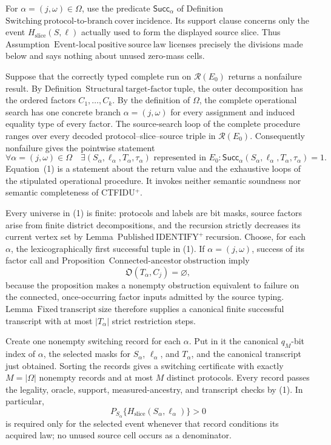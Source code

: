 For \(\alpha=(j,\omega)\in\Omega\), use the predicate
\(\mathsf{Succ}_{\alpha}\) of Definition~\(\mathrm{Switching\ protocol\mbox{-}to\mbox{-}branch\ cover\ incidence}\).
Its support clause concerns only the event \(H_{\mathrm{slice}}(S,\ell)\) actually used to form the displayed source slice.  Thus Assumption~\(\mathrm{Event\mbox{-}local\ positive\ source\ law}\) licenses precisely the divisions made below and says nothing about unused zero-mass cells.

Suppose that the correctly typed complete run on \(\mathcal R(E_0)\) returns a nonfailure result.  By Definition~\(\mathrm{Structural\ target\mbox{-}factor\ tuple}\), the outer decomposition has the ordered factors \(C_1,\ldots,C_k\).  By the definition of \(\Omega\), the complete operational search has one concrete branch \(\alpha=(j,\omega)\) for every assignment and induced equality type of every factor.  The source-search loop of the complete procedure ranges over every decoded protocol--slice--source triple in \(\mathcal R(E_0)\).  Consequently nonfailure gives the pointwise statement
\[
 \forall\alpha=(j,\omega)\in\Omega\quad
 \exists(S_{\alpha},\ell_{\alpha},T_{\alpha},\tau_{\alpha})
 \text{ represented in }E_0:
 \mathsf{Succ}_{\alpha}(S_{\alpha},\ell_{\alpha},T_{\alpha},\tau_{\alpha})=1.
 \tag{1}
\]
Equation~(1) is a statement about the return value and the exhaustive loops of the stipulated operational procedure.  It invokes neither semantic soundness nor semantic completeness of CTFIDU\({}^{+}\).

Every universe in (1) is finite: protocols and labels are bit masks, source factors arise from finite district decompositions, and the recursion strictly decreases its current vertex set by Lemma~\(\mathrm{Published\ IDENTIFY}^{+}\mathrm{\ recursion}\).  Choose, for each \(\alpha\), the lexicographically first successful tuple in (1).  If \(\alpha=(j,\omega)\), success of its factor call and Proposition~\(\mathrm{Connected\mbox{-}ancestor\ obstruction}\) imply
\[
 \mathfrak O(T_{\alpha},C_j)=\varnothing,
 \tag{2}
\]
because the proposition makes a nonempty obstruction equivalent to failure on the connected, once-occurring factor inputs admitted by the source typing.  Lemma~\(\mathrm{Fixed\ transcript\ size}\) therefore supplies a canonical finite successful transcript with at most \(|T_{\alpha}|\) strict restriction steps.

Create one nonempty switching record for each \(\alpha\).  Put in it the canonical \(q_M\)-bit index of \(\alpha\), the selected masks for \(S_{\alpha}\), \(\ell_{\alpha}\), and \(T_{\alpha}\), and the canonical transcript just obtained.  Sorting the records gives a switching certificate with exactly \(M=|\Omega|\) nonempty records and at most \(M\) distinct protocols.  Every record passes the legality, oracle, support, measured-ancestry, and transcript checks by (1).  In particular,
\[
 P_{S_{\alpha}}\{H_{\mathrm{slice}}(S_{\alpha},\ell_{\alpha})\}>0
 \tag{3}
\]
is required only for the selected event whenever that record conditions its acquired law; no unused source cell occurs as a denominator.

